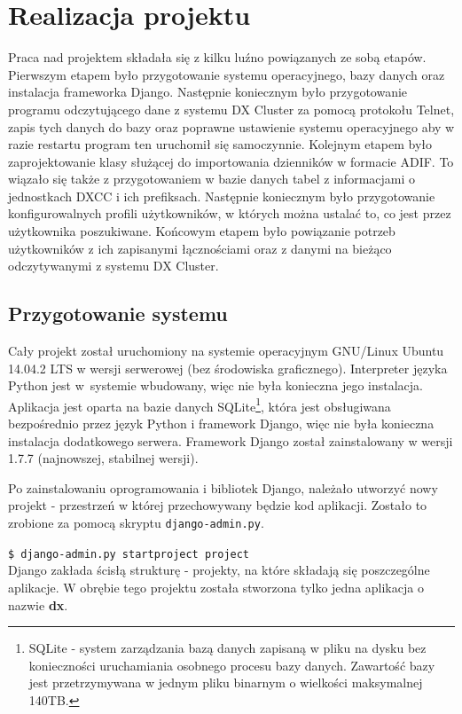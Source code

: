 \documentclass[]{mgr}
\begin{document}
    \chapter{Realizacja projektu}
    \label{sec:project_realization}
    Praca nad projektem składała się z kilku luźno powiązanych ze sobą etapów. Pierwszym etapem było przygotowanie systemu operacyjnego, bazy danych oraz instalacja frameworka Django. Następnie koniecznym było przygotowanie programu odczytującego dane z systemu DX Cluster za pomocą protokołu Telnet, zapis tych danych do bazy oraz poprawne ustawienie systemu operacyjnego aby w razie restartu program ten uruchomił się samoczynnie. Kolejnym etapem było zaprojektowanie klasy służącej do importowania dzienników w formacie ADIF. To wiązało się także z przygotowaniem w bazie danych tabel z informacjami o jednostkach DXCC i ich prefiksach. Następnie koniecznym było przygotowanie konfigurowalnych profili użytkowników, w których można ustalać to, co jest przez użytkownika poszukiwane. Końcowym etapem było powiązanie potrzeb użytkowników z ich zapisanymi łącznościami oraz z danymi na bieżąco odczytywanymi z systemu DX Cluster.

        \section{Przygotowanie systemu}
        Cały projekt został uruchomiony na systemie operacyjnym GNU/Linux Ubuntu 14.04.2 LTS w wersji serwerowej (bez środowiska graficznego). Interpreter języka Python jest w~systemie wbudowany, więc nie była konieczna jego instalacja. Aplikacja jest oparta na bazie danych SQLite\footnote{SQLite - system zarządzania bazą danych zapisaną w pliku na dysku bez konieczności uruchamiania osobnego procesu bazy danych. Zawartość bazy jest przetrzymywana w jednym pliku binarnym o wielkości maksymalnej 140TB.}, która jest obsługiwana bezpośrednio przez język Python i framework Django, więc nie była konieczna instalacja dodatkowego serwera. Framework Django został zainstalowany w wersji 1.7.7 (najnowszej, stabilnej wersji).

        Po zainstalowaniu oprogramowania i bibliotek Django, należało utworzyć nowy projekt - przestrzeń w której przechowywany będzie kod aplikacji. Zostało to zrobione za pomocą skryptu \texttt{django-admin.py}.

        \texttt{\$ django-admin.py startproject project}\\

        \noindent Django zakłada ścisłą strukturę - projekty, na które składają się poszczególne aplikacje. W obrębie tego projektu została stworzona tylko jedna aplikacja o nazwie \textbf{dx}.
\end{document}
